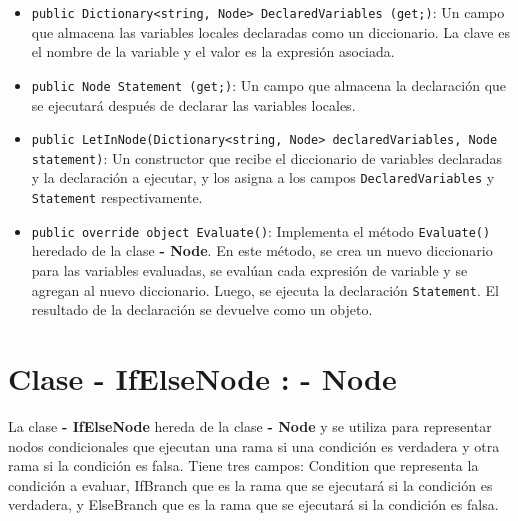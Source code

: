 \documentclass{article}
\newcommand{\subclassed}[1]{\textcolor{classcolor}{\textbf{- #1}}}
\begin{document}
\begin{itemize}
    \item \lstinline{public Dictionary<string, Node> DeclaredVariables (get;)}: Un campo que almacena las variables locales declaradas como un diccionario. La clave es el nombre de la variable y el valor es la expresión asociada.

    \item \lstinline{public Node Statement (get;)}: Un campo que almacena la declaración que se ejecutará después de declarar las variables locales.

    \item \lstinline{public LetInNode(Dictionary<string, Node> declaredVariables, Node statement)}: Un constructor que recibe el diccionario de variables declaradas y la declaración a ejecutar, y los asigna a los campos \lstinline{DeclaredVariables} y \lstinline{Statement} respectivamente.

    \item \lstinline{public override object Evaluate()}: Implementa el método \lstinline{Evaluate()} heredado de la clase \subclassed{Node}. En este método, se crea un nuevo diccionario para las variables evaluadas, se evalúan cada expresión de variable y se agregan al nuevo diccionario. Luego, se ejecuta la declaración \lstinline{Statement}. El resultado de la declaración se devuelve como un objeto.
\end{itemize}
\section{Clase \subclassed{IfElseNode} : \subclassed{Node}}

La clase \subclassed{IfElseNode} hereda de la clase \subclassed{Node} y se utiliza para representar nodos condicionales que ejecutan una rama si una condición es verdadera y otra rama si la condición es falsa. Tiene tres campos: \textcolor{fieldcolor}{Condition} que representa la condición a evaluar, \textcolor{fieldcolor}{IfBranch} que es la rama que se ejecutará si la condición es verdadera, y \textcolor{fieldcolor}{ElseBranch} que es la rama que se ejecutará si la condición es falsa.
\end{document}
